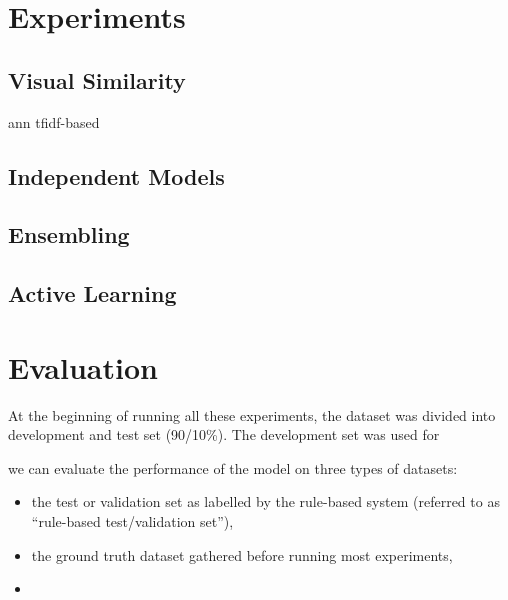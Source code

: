 \section{Experiments}
\label{exp}

\subsection{Visual Similarity}
\label{exp_sim}

ann
tfidf-based

\subsection{Independent Models}
\label{exp_models}

\subsection{Ensembling}
\label{exp_ensembling}

\subsection{Active Learning}
\label{exp_al}


\section{Evaluation}
\label{evaluation}

At the beginning of running all these experiments, the dataset was divided into development and test set (90/10\%).
The development set was used for


 we can evaluate the performance of the model on three types of datasets:

\begin{itemize}
  \item the test or validation set as labelled by the rule-based system (referred to as ``rule-based test/validation set''),
  \item the ground truth dataset gathered  before running most experiments,
  \item
\end{itemize}
